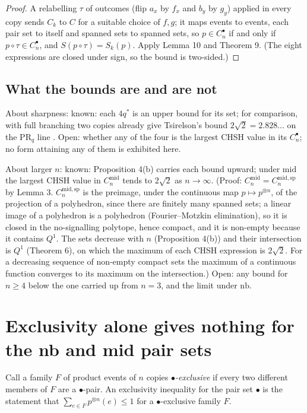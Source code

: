 \documentclass[11pt,a4paper]{article}
\theoremstyle{definition}
\theoremstyle{remark}
\newcommand{\PR}{\mathrm{PR}}
\newcommand{\nb}{\mathrm{nb}}
\newcommand{\md}{\mathrm{mid}}
\newcommand{\ps}{\bullet}
\begin{document}
\begin{proof}
A relabelling $\tau$ of outcomes (flip $a_x$ by $f_x$ and $b_y$ by $g_y$) applied in every copy sends $C_k$ to $C$ for a suitable choice of $f, g$; it maps events to events, each pair set to itself and spanned sets to spanned sets, so $p \in C_n^{\ps}$ if and only if $p \circ \tau \in C_n^{\ps}$, and $S(p \circ \tau) = S_k(p)$. Apply Lemma 10 and Theorem 9. (The eight expressions are closed under sign, so the bound is two-sided.)
\end{proof}

\subsection{What the bounds are and are not}

About sharpness: known: each $4q^*$ is an upper bound for its set; for comparison, with full branching two copies already give Tsirelson's bound $2\sqrt{2} = 2.828\ldots$ on the $\PR_q$ line \cite{TC}. Open: whether any of the four is the largest CHSH value in its $C_n^{\ps}$; no form attaining any of them is exhibited here.

About larger $n$: known: Proposition 4(b) carries each bound upward; under $\md$ the largest CHSH value in $C_n^{\md}$ tends to $2\sqrt{2}$ as $n \to \infty$. (Proof: $C_n^{\md} = C_n^{\md,\mathrm{sp}}$ by Lemma 3. $C_n^{\md,\mathrm{sp}}$ is the preimage, under the continuous map $p \mapsto p^{\otimes n}$, of the projection of a polyhedron, since there are finitely many spanned sets; a linear image of a polyhedron is a polyhedron (Fourier--Motzkin elimination), so it is closed in the no-signalling polytope, hence compact, and it is non-empty because it contains $Q^1$. The sets decrease with $n$ (Proposition 4(b)) and their intersection is $Q^1$ (Theorem 6), on which the maximum of each CHSH expression is $2\sqrt{2}$. For a decreasing sequence of non-empty compact sets the maximum of a continuous function converges to its maximum on the intersection.) Open: any bound for $n \ge 4$ below the one carried up from $n = 3$, and the limit under $\nb$.
\section{Exclusivity alone gives nothing for the nb and mid pair sets}

Call a family $F$ of product events of $n$ copies \emph{$\ps$-exclusive} if every two different members of $F$ are a $\ps$-pair. An exclusivity inequality for the pair set $\ps$ is the statement that $\sum_{e \in F} p^{\otimes n}(e) \le 1$ for a $\ps$-exclusive family $F$.
\end{document}
